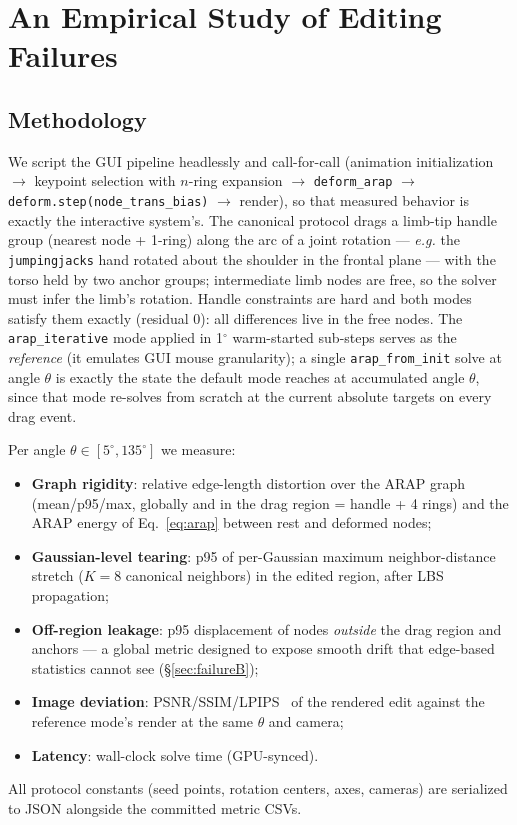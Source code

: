 \documentclass[10pt,twocolumn]{article}
\newcommand{\fromInit}{\texttt{arap\_from\_init}}
\newcommand{\iterMode}{\texttt{arap\_iterative}}
\newcommand{\eg}{\emph{e.g.}}
\begin{document}
\section{An Empirical Study of Editing Failures}
\label{sec:failures}

\subsection{Methodology}
\label{sec:method-study}

We script the GUI pipeline headlessly and call-for-call (animation
initialization $\rightarrow$ keypoint selection with $n$-ring expansion
$\rightarrow$ \texttt{deform\_arap} $\rightarrow$
\texttt{deform.step(node\_trans\_bias)} $\rightarrow$ render), so that measured
behavior is exactly the interactive system's. The canonical protocol drags a
limb-tip handle group (nearest node + 1-ring) along the arc of a joint rotation
--- \eg{} the \texttt{jumpingjacks} hand rotated about the shoulder in the
frontal plane --- with the torso held by two anchor groups; intermediate limb
nodes are free, so the solver must infer the limb's rotation. Handle
constraints are hard and both modes satisfy them exactly (residual 0): all
differences live in the free nodes. The \iterMode{} mode applied in
1$^\circ$ warm-started sub-steps serves as the \emph{reference} (it emulates
GUI mouse granularity); a single \fromInit{} solve at angle $\theta$ is exactly
the state the default mode reaches at accumulated angle $\theta$, since that
mode re-solves from scratch at the current absolute targets on every drag
event.

Per angle $\theta \in [5^\circ, 135^\circ]$ we measure:
\begin{itemize}\itemsep1pt
  \item \textbf{Graph rigidity}: relative edge-length distortion over the ARAP
        graph (mean/p95/max, globally and in the drag region = handle + 4
        rings) and the ARAP energy of Eq.~\eqref{eq:arap} between rest and
        deformed nodes;
  \item \textbf{Gaussian-level tearing}: p95 of per-Gaussian maximum
        neighbor-distance stretch ($K{=}8$ canonical neighbors) in the edited
        region, after LBS propagation;
  \item \textbf{Off-region leakage}: p95 displacement of nodes \emph{outside}
        the drag region and anchors --- a global metric designed to expose
        smooth drift that edge-based statistics cannot see
        (\S\ref{sec:failureB});
  \item \textbf{Image deviation}: PSNR/SSIM/LPIPS~\cite{lpips} of the rendered
        edit against the reference mode's render at the same $\theta$ and
        camera;
  \item \textbf{Latency}: wall-clock solve time (GPU-synced).
\end{itemize}
All protocol constants (seed points, rotation centers, axes, cameras) are
serialized to JSON alongside the committed metric CSVs.
\end{document}
